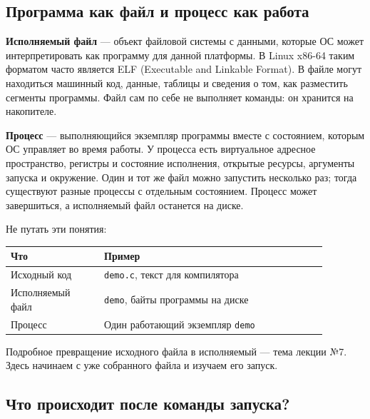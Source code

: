 \subsection{Программа как файл и процесс как работа}

\textbf{Исполняемый файл} --- объект файловой системы с данными, которые ОС
может интерпретировать как программу для данной платформы. В Linux x86-64 таким
форматом часто является ELF (Executable and Linkable Format). В файле могут
находиться машинный код, данные, таблицы и сведения о том, как разместить
сегменты программы. Файл сам по себе не выполняет команды: он хранится на
накопителе.

\textbf{Процесс} --- выполняющийся экземпляр программы вместе с состоянием,
которым ОС управляет во время работы. У процесса есть виртуальное адресное
пространство, регистры и состояние исполнения, открытые ресурсы, аргументы
запуска и окружение. Один и тот же файл можно запустить несколько раз; тогда
существуют разные процессы с отдельным состоянием. Процесс может завершиться,
а исполняемый файл останется на диске.

Не путать эти понятия:
\begin{center}
\small
\begin{tabular}{|p{0.26\linewidth}|p{0.62\linewidth}|}
\hline
Что & Пример \\
\hline
Исходный код & \texttt{demo.c}, текст для компилятора \\
Исполняемый файл & \texttt{demo}, байты программы на диске \\
Процесс & Один работающий экземпляр \texttt{demo} \\
\hline
\end{tabular}
\end{center}

Подробное превращение исходного файла в исполняемый --- тема лекции №7. Здесь
начинаем с уже собранного файла и изучаем его запуск.

\subsection{Что происходит после команды запуска?}

